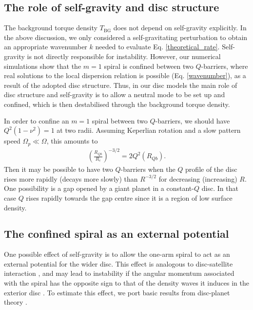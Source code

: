 
\subsection{The role of self-gravity and disc structure} 
The background torque density $T_\mathrm{BG}$ does not depend on  
self-gravity explicitly. In the above discussion, we only considered a self-gravitating perturbation to 
obtain an appropriate wavenumber $k$ needed to evaluate
Eq. \ref{theoretical_rate}. Self-gravity is not directly
responsible for instability. However, 
our numerical simulations show that the $m=1$ spiral is
confined between two $Q$-barriers, where real solutions to the local
dispersion relation is possible (Eq. \ref{wavenumber}), as a result of the adopted disc
structure. Thus, in our disc models the main role of disc structure and self-gravity is to 
allow a neutral mode to be set up and confined, which is then
destabilised through the background torque density. 

In order to confine an $m=1$ spiral between two $Q$-barriers, we
should have $Q^2(1-\nu^2)=1$ at two radii. Assuming 
Keperlian rotation and a slow pattern speed $\Omega_p\ll\Omega$, this amounts to
\begin{align}
  \left(\frac{R_{Qb}}{R_c}\right)^{-3/2} = 2Q^2(R_{Qb}). 
\end{align}
Then it may be possible to have two $Q$-barriers when the $Q$ profile
of the disc rises more rapidly (decays more slowly) than $R^{-3/2}$
for decreasing (increasing) $R$. One possibility is a gap
opened by a giant planet in a constant-$Q$ disc. In that case $Q$
rises rapidly towards the gap centre since it is a region of low
surface density.  %






\subsection{The confined spiral as an external potential}
One possible effect of self-gravity is to allow the one-arm spiral 
to act as an external potential for the wider disc. This effect is
analogous to disc-satellite interaction 
\citep{goldreich79}, and may lead to instability 
if the angular momentum associated with the spiral has the opposite 
sign to that of the density waves it induces in the exterior disc
\citep{lin11b}. To estimate this effect, we port basic results from
disc-planet theory \citep[see, e.g.][and references
therein]{papaloizou07}. 


